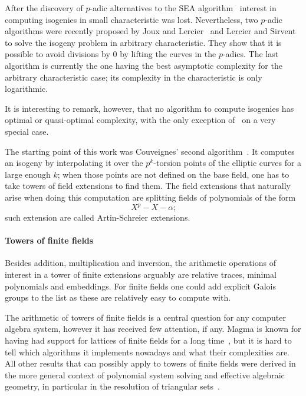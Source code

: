 After the discovery of $p$-adic alternatives to the SEA
algorithm~\cite{satoh00,fouquet+gaudry+harley00} interest in computing
isogenies in small characteristic was lost.  Nevertheless, two
$p$-adic algorithms were recently proposed by Joux and
Lercier~\cite{joux+lercier06} and Lercier and
Sirvent~\cite{lercier+sirvent08} to solve the isogeny problem in
arbitrary characteristic. They show that it is possible to avoid
divisions by $0$ by lifting the curves in the $p$-adics. The last
algorithm is currently the one having the best asymptotic complexity
for the arbitrary characteristic case; its complexity in the
characteristic is only logarithmic.

It is interesting to remark, however, that no algorithm to compute
isogenies has optimal or quasi-optimal complexity, with the only
exception of~\cite{bostan+morain+salvy+schost08} on a very special
case. 

The starting point of this work was Couveignes' second
algorithm~\cite{couveignes96}. It computes an isogeny by interpolating
it over the $p^k$-torsion points of the elliptic curves for a large
enough $k$; when those points are not defined on the base field, one
has to take towers of field extensions to find them. The field
extensions that naturally arise when doing this computation are
splitting fields of polynomials of the form
\[X^p - X -\alpha\text{;}\] such extension are called Artin-Schreier
extensions. 


\paragraph*{Towers of finite fields}
Besides addition, multiplication and inversion, the arithmetic
operations of interest in a tower of finite extensions arguably are
relative traces, minimal polynomials and embeddings. For finite fields
one could add explicit Galois groups to the list as these are
relatively easy to compute with.

The arithmetic of towers of finite fields is a central question for
any computer algebra system, however it has received few attention, if
any. Magma is known for having had support for lattices of finite
fields for a long time~\cite{bosma+cannon+steel97}, but it is hard to
tell which algorithms it implements nowadays and what their
complexities are. All other results that can possibly apply to towers
of finite fields were derived in the more general context of
polynomial system solving and effective algebraic geometry, in
particular in the resolution of triangular
sets~\cite{diaz+gonzalez01,giusti+lecerf+salvy01,bostan+salvy+schost03,pascal+schost06,li+moreno+schost07,dahan+jin+moreno+schost08,boulier+lemaire+moreno01,FGLM,rouiller99,alonso+becker+roy+wormann}.

